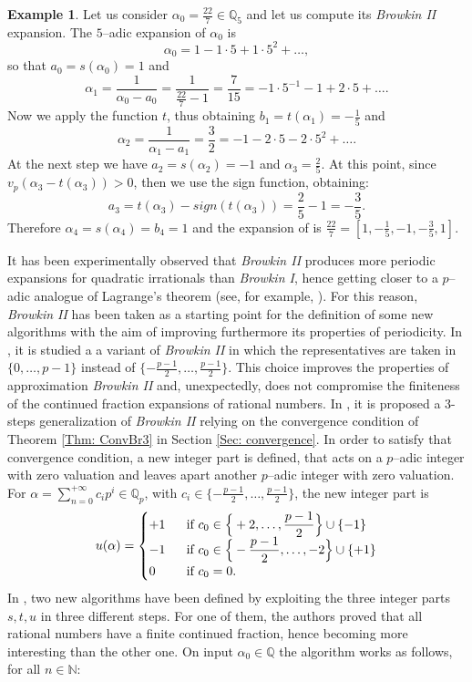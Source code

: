 \documentclass[12pt, reqno]{amsart}
\theoremstyle{plain}
\theoremstyle{definition}
\newtheorem{Example}[Theorem]{Example}
\begin{document}
\begin{Example}
Let us consider $\alpha_0 = \frac{22}{7} \in \mathbb Q_5$ and let us compute its \textit{Browkin II} expansion. The $5$--adic expansion of $\alpha_0$ is
\[\alpha_0 = 1 - 1 \cdot 5 + 1 \cdot 5^2 + \ldots,\]
so that $a_0= s(\alpha_0) = 1$ and
\[\alpha_1 =\frac{1}{\alpha_0-a_0}=\frac{1}{\frac{22}{7}-1}= \frac{7}{15} = -1 \cdot 5^{-1} - 1 +2 \cdot 5 + \ldots.\]
Now we apply the function $t$, thus obtaining $b_1 = t(\alpha_1) = -\frac{1}{5}$ and
\[\alpha_2 =\frac{1}{\alpha_1-a_1}=\frac{3}{2}=-1 -2 \cdot 5 - 2 \cdot 5^2+ \ldots.\]
At the next step we have $a_2 = s(\alpha_2) = -1$ and  $\alpha_3 = \frac{2}{5}$. At this point, since $v_p(\alpha_3-t(\alpha_3))>0$, then we use the sign function, obtaining:
\[a_3 = t(\alpha_3) - sign(t(\alpha_3)) =\frac{2}{5}-1 = -\frac{3}{5}.\]
Therefore $\alpha_4=s(\alpha_4)=b_4=1$ and the expansion of is $\frac{22}{7} = \left[ 1, -\frac{1}{5}, -1, -\frac{3}{5}, 1 \right]$.
\end{Example}
It has been experimentally observed that \textit{Browkin II} produces more periodic expansions for quadratic irrationals than \textit{Browkin I}, hence getting closer to a $p$--adic analogue of Lagrange's theorem (see, for example, \cite{MR}). For this reason, \textit{Browkin II} has been taken as a starting point for the definition of some new algorithms with the aim of improving furthermore its properties of periodicity. In \cite{BCMII}, it is studied a a variant of \textit{Browkin II} in which the representatives are taken in $\{0,\ldots,p-1 \}$ instead of $\{-\frac{p-1}{2},\ldots,\frac{p-1}{2}\}$. This choice improves the properties of approximation \textit{Browkin II} and, unexpectedly, does not compromise the finiteness of the continued fraction expansions of rational numbers. In \cite{MRSII}, it is proposed a $3$-steps generalization of \textit{Browkin II} relying on the convergence condition of Theorem \ref{Thm: ConvBr3} in Section \ref{Sec: convergence}. In order to satisfy that convergence condition, a new integer part is defined, that acts on a $p$--adic integer with zero valuation and leaves apart another $p$--adic integer with zero valuation. For $\alpha=\sum\limits_{n=0}^{+\infty}c_ip^i\in\mathbb{Q}_p$, with $c_i \in \{ -\frac{p-1}{2}, \ldots, \frac{p-1}{2} \}$, the new integer part is
\begin{align}\label{Eq: u}
u(\alpha)=\begin{cases} +1 \ \  &\textup{if}  \ c_0\in\Big\{+2,\ldots,\dfrac{p-1}{2}\Big\}\cup \{-1\}\\
-1 &\textup{if}  \ c_0\in\Big\{-\dfrac{p-1}{2},\ldots,-2\Big\}\cup \{+1\}\\
0 \ \ &\textup{if}  \ c_0=0.
\end{cases}
\end{align}
In \cite{MRSII}, two new algorithms have been defined by exploiting the three integer parts $s,t,u$ in three different steps. For one of them, the authors proved that all rational numbers have a finite continued fraction, hence becoming more interesting than the other one. On input $\alpha_0\in\mathbb{Q}$ the algorithm works as follows, for all $n\in\mathbb{N}$:
\end{document}
